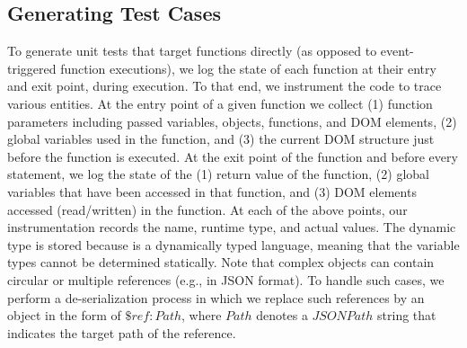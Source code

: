 \subsection{Generating Test Cases}
\label{Sec:testCaseGen}


 \label{Sec:jsFuncTesting}
To generate unit tests that target \javascript functions directly (as opposed to event-triggered function executions), we log the state of each function at their entry and exit point, during execution.
To that end, we instrument the code to trace  various entities.
%
At the entry point of a given \javascript function we collect (1) function parameters including passed variables, objects, functions, and DOM elements, (2) global variables used in the function, and (3) the current DOM structure just before the function is executed. At the exit point of the \javascript function and before every  statement, we log the state of the (1) return value of the function, (2) global variables that have been accessed in that function, and (3) DOM elements accessed (read/written) in the function.
At each of the above points, our instrumentation records the name, runtime type, and actual values.
The dynamic type is stored because \javascript is a dynamically typed language, meaning that the variable types cannot be determined statically. 
Note that complex \javascript objects can contain circular or multiple references (e.g., in JSON format). To handle such cases, we perform a de-serialization process in which we replace such references by an object in the form
of ${\$ref: Path}$, where $Path$ denotes a $JSONPath$ string that indicates the target path of the reference.

